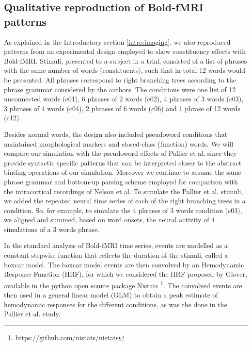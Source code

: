 \documentclass[10pt]{article}
\begin{document}
\subsection{Qualitative reproduction of Bold-fMRI patterns}
{\label{sec:pnas-patterns}}

As explained in the Introductory section \ref{intro:imaging}, we also reproduced patterns from an experimental design employed to show constituency effects with Bold-fMRI\cite{Pallier_2011}. 
Stimuli, presented to a subject in a trial, consisted of a list of phrases with the same number of words (constituents), such that in total 12 words would be presented.
All phrases correspond to right branching trees according to the phrase grammar considered by the authors.
The conditions were one list of 12 unconnected words (c01), 6 phrases of 2 words (c02), 4 phrases of 3 words (c03), 3 phrases of 4 words (c04), 2 phrases of 6 words (c06) and 1 phrase of 12 words (c12).

Besides normal words, the design also included pseudoword conditions that maintained morphological markers and closed-class (function) words.
We will compare our simulation with the pseudoword effects of Pallier et al, since they provide syntactic specific patterns that can be interpreted closer to the abstract binding operations of our simulation.
Moreover we continue to assume the same phrase grammar and bottom-up parsing scheme employed for comparison with the intracortical recordings of Nelson et al.
To simulate the Pallier et al. stimuli, we added the repeated neural time series of each of the right branching trees in a condition.
So, for example, to simulate the 4 phrases of 3 words condition (c03), we aligned and summed, based on word onsets, the neural activity of 4 simulations of a 3 words phrase.

In the standard analysis of Bold-fMRI time series, events are modelled as a constant stepwise function that reflects the duration of the stimuli, called a boxcar model.
The boxcar model events are then convolved by an Hemodynamic Response Function (HRF), for which we considered the HRF proposed by Glover\cite{Glover_1999}, available in the python open source package Nistats \footnote{https://github.com/nistats/nistats}.
The convolved events are then used in a general linear model (GLM) to obtain a peak estimate of hemodynamic responses for the different conditions, as was the done in the Pallier et al. study.
\end{document}
